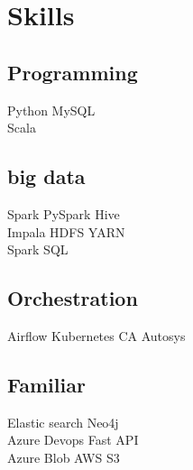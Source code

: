 \documentclass[]{deedy-resume-openfont}
\begin{document}
%
%

%
%

%
%

\begin{minipage}[t]{0.33\textwidth} 




\section{Skills}
\subsection{Programming}
Python \textbullet{} 
  MySQL \\
Scala
\sectionsep
\subsection{big data}
Spark \textbullet{} PySpark \textbullet{} Hive\\
Impala \textbullet{} 
HDFS \textbullet{} YARN\\
Spark SQL
\sectionsep
\subsection{Orchestration}
Airflow \textbullet{} Kubernetes \textbullet{} CA Autosys\\


\sectionsep
\subsection{Familiar}
Elastic search \textbullet{} Neo4j\\
Azure Devops \textbullet{} Fast API\\
Azure Blob \textbullet{} AWS S3\\

\sectionsep




\end{minipage}
\end{document}
